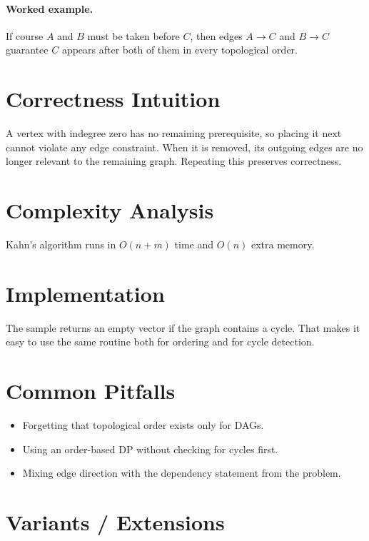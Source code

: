 \paragraph{Worked example.}
If course \(A\) and \(B\) must be taken before \(C\), then edges \(A \to C\) and \(B \to C\) guarantee \(C\) appears
after both of them in every topological order.

\section*{Correctness Intuition}

A vertex with indegree zero has no remaining prerequisite, so placing it next cannot violate any edge constraint. When
it is removed, its outgoing edges are no longer relevant to the remaining graph. Repeating this preserves correctness.

\section*{Complexity Analysis}

Kahn's algorithm runs in \(O(n + m)\) time and \(O(n)\) extra memory.

\section*{Implementation}

The sample returns an empty vector if the graph contains a cycle. That makes it easy to use the same routine both for
ordering and for cycle detection.

\section*{Common Pitfalls}

\begin{itemize}
  \item Forgetting that topological order exists only for DAGs.
  \item Using an order-based DP without checking for cycles first.
  \item Mixing edge direction with the dependency statement from the problem.
\end{itemize}

\section*{Variants / Extensions}

